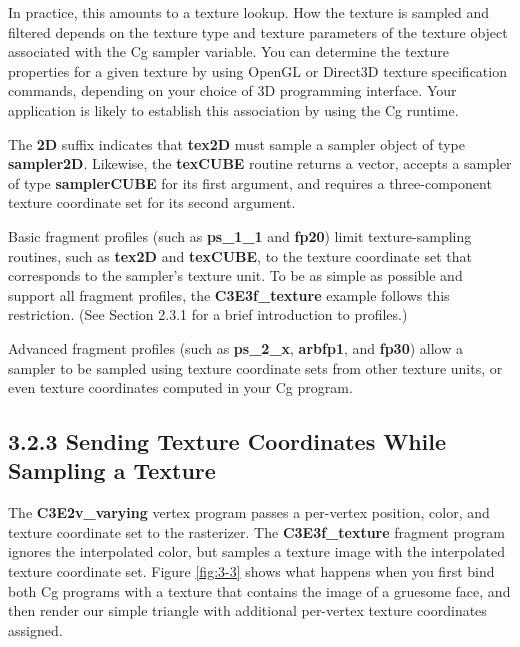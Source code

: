 \documentclass{book}
\begin{document}
In practice, this amounts to a texture lookup. How the texture is sampled and filtered depends on the texture type and texture parameters of the texture object associated with the Cg sampler variable. You can determine the texture properties for a given texture by using OpenGL or Direct3D texture specification commands, depending on your choice of 3D programming interface. Your application is likely to establish this association by using the Cg runtime.

The \textbf{2D} suffix indicates that \textbf{tex2D} must sample a sampler object of type \textbf{sampler2D}. Likewise, the \textbf{texCUBE} routine returns a vector, accepts a sampler of type \textbf{samplerCUBE} for its first argument, and requires a three-component texture coordinate set for its second argument.

Basic fragment profiles (such as \textbf{ps_1_1} and \textbf{fp20}) limit texture-sampling routines, such as \textbf{tex2D} and \textbf{texCUBE}, to the texture coordinate set that corresponds to the sampler's texture unit. To be as simple as possible and support all fragment profiles, the \textbf{C3E3f_texture} example follows this restriction. (See Section 2.3.1 for a brief introduction to profiles.)

Advanced fragment profiles (such as \textbf{ps_2_x}, \textbf{arbfp1}, and \textbf{fp30}) allow a sampler to be sampled using texture coordinate sets from other texture units, or even texture coordinates computed in your Cg program.

\subsection{3.2.3 Sending Texture Coordinates While Sampling a Texture}

The \textbf{C3E2v_varying} vertex program passes a per-vertex position, color, and texture coordinate set to the rasterizer. The \textbf{C3E3f_texture} fragment program ignores the interpolated color, but samples a texture image with the interpolated texture coordinate set. Figure \ref{fig:3-3} shows what happens when you first bind both Cg programs with a texture that contains the image of a gruesome face, and then render our simple triangle with additional per-vertex texture coordinates assigned.
\end{document}
